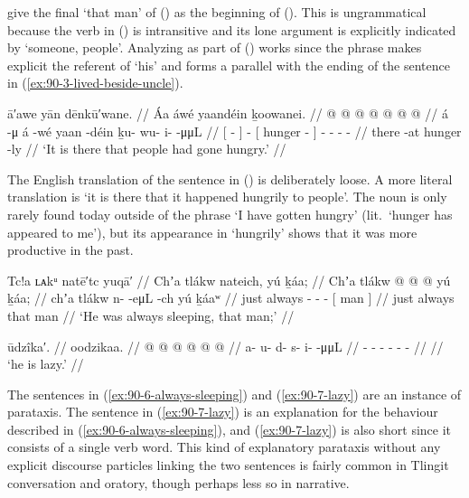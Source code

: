 \citeauthor{swanton:1909} give the final  ‘that man’ of (\lastx) as the beginning of (\nextx).
This is ungrammatical because the verb in (\nextx) is intransitive and its lone argument is explicitly indicated by  ‘someone, people’.
Analyzing  as part of (\lastx) works since the phrase makes explicit the referent of  ‘his’ and forms a parallel with the ending of the sentence in (\ref{ex:90-3-lived-beside-uncle}).

\ex\label{ex:90-5-there-went-hungry}%
%
\begingl
	\glpreamble	ā′awe yān dēnkū′wane. //
	\glpreamble	Áa áwé yaandéin ḵoowanei. //
	\gla	{}  @ {} {}
		 @ {}
		{}  @ {} {}
		 @ {} @ {} @ {} @ {}  //
	\glb	{} á -μ {}
		á -wé
		{} yaan -déin {}
		ḵu- wu- i-  -μμL //
	\glc	{}[  - {}]
		 -
		{}[ hunger - {}]
		- - -  - //
	\gld	{} there -at {}
		 {}
		{} hunger -ly {}
		 {} {} {} {} //
	\glft	‘It is there that people had gone hungry.’
		//
\endgl
\xe

The English translation of the sentence in (\lastx) is deliberately loose.
A more literal translation is ‘it is there that it happened hungrily to people’.
The noun  is only rarely found today outside of the phrase  ‘I have gotten hungry’ (lit.\ ‘hunger has appeared to me’), but its appearance in  ‘hungrily’ shows that it was more productive in the past.

\ex\label{ex:90-6-always-sleeping}%
%
\begingl
	\glpreamble	Tc!a ʟᴀkᵘ natē′tc yuqā′ //
	\glpreamble	Chʼa tlákw nateich, yú ḵáa; //
	\gla	Chʼa tlákw  @ {} @ {} @ {}
		{} yú ḵáa; {} //
	\glb	chʼa tlákw n-  -eμL -ch
		{} yú ḵáaʷ {} //
	\glc	just always -  - -
		{}[  man {}] //
	\gld	just always  {} {} {}
		{} that man {} //
	\glft	‘He was always sleeping, that man;’
		//
\endgl
\xe

\ex\label{ex:90-7-lazy}%
%
\begingl
	\glpreamble	ūdzîka′. //
	\glpreamble	oodzikaa. //
	\gla	{} @ {} @ {} @ {} @ {} @ {} @ {} //
	\glb	a- u- d- s- i-  -μμL //
	\glc	{}- - - - -  - //
	\gld	{} {} {} {} {} {} {} //
	\glft	‘he is lazy.’
		//
\endgl
\xe

The sentences in (\ref{ex:90-6-always-sleeping}) and (\ref{ex:90-7-lazy}) are an instance of parataxis.
The sentence in (\ref{ex:90-7-lazy}) is an explanation for the behaviour described in (\ref{ex:90-6-always-sleeping}), and (\ref{ex:90-7-lazy}) is also short since it consists of a single verb word.
This kind of explanatory parataxis without any explicit discourse particles linking the two sentences is fairly common in Tlingit conversation and oratory, though perhaps less so in narrative.

